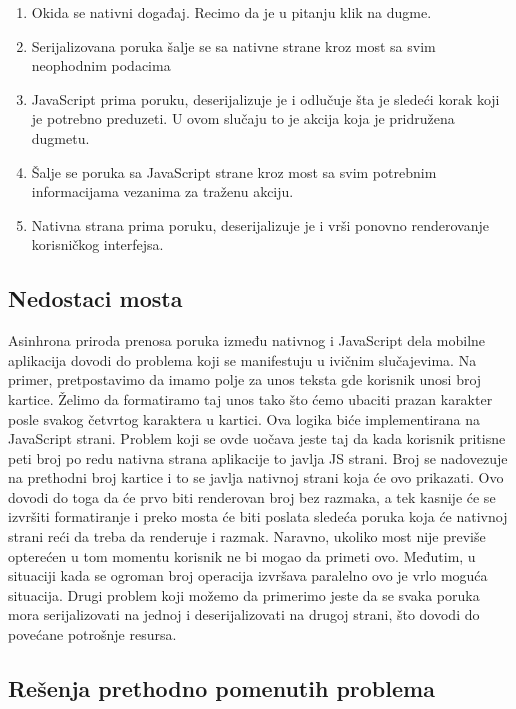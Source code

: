 \documentclass[12pt,oneside]{memoir}
\begin{document}
\begin{enumerate}
    \item Okida se nativni događaj. Recimo da je u pitanju klik na dugme.
    \item Serijalizovana poruka šalje se sa nativne strane kroz most sa svim neophodnim podacima
    \item JavaScript prima poruku, deserijalizuje je i odlučuje šta je sledeći korak koji je potrebno preduzeti. U ovom slučaju to je akcija koja je pridružena dugmetu.
    \item Šalje se poruka sa JavaScript strane kroz most sa svim potrebnim informacijama vezanima za traženu akciju.
    \item Nativna strana prima poruku, deserijalizuje je i vrši ponovno renderovanje korisničkog interfejsa.
\end{enumerate}

\subsection{Nedostaci mosta}

Asinhrona priroda prenosa poruka između nativnog i JavaScript dela mobilne aplikacija dovodi do problema koji se manifestuju u ivičnim slučajevima. Na primer, pretpostavimo da imamo polje za unos teksta gde korisnik unosi broj kartice. Želimo da formatiramo taj unos tako što ćemo ubaciti prazan karakter posle svakog četvrtog karaktera u kartici. Ova logika biće implementirana na JavaScript strani. Problem koji se ovde uočava jeste taj da kada korisnik pritisne peti broj po redu nativna strana aplikacije to javlja JS strani. Broj se nadovezuje na prethodni broj kartice i to se javlja nativnoj strani koja će ovo prikazati. Ovo dovodi do toga da će prvo biti renderovan broj bez razmaka, a tek kasnije će se izvršiti formatiranje i preko mosta će biti poslata sledeća poruka koja će nativnoj strani reći da treba da renderuje i razmak. Naravno, ukoliko most nije previše opterećen u tom momentu korisnik ne bi mogao da primeti ovo. Međutim, u situaciji kada se ogroman broj operacija izvršava paralelno ovo je vrlo moguća situacija. Drugi problem koji možemo da primerimo jeste da se svaka poruka mora serijalizovati na jednoj i deserijalizovati na drugoj strani, što dovodi do povećane potrošnje resursa.

\subsection{Rešenja prethodno pomenutih problema}
\end{document}

